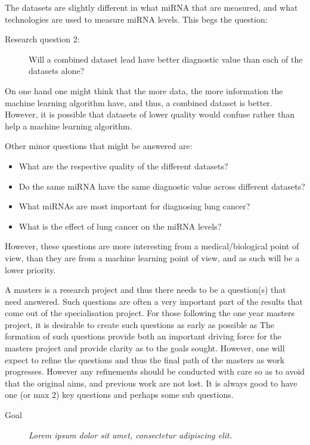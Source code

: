 The datasets are slightly different in what miRNA that are measured, and what technologies are used to measure miRNA levels. This begs the question:

\begin{description}
\item[Research question 2:] Will a combined dataset lead have better diagnostic value than each of the datasets alone?
\end{description}

On one hand one might think that the more data, the more information the machine learning algorithm have, and thus, a combined dataset is better. However, it is possible that datasets of lower quality would confuse rather than help a machine learning algorithm.

Other minor questions that might be answered are:
\begin{itemize}
    \item What are the respective quality of the different datasets?
    \item Do the same miRNA have the same diagnostic value across different datasets?
    \item What miRNAs are most important for diagnosing lung cancer?
    \item What is the effect of lung cancer on the miRNA levels?
\end{itemize}

However, these questions are more interesting from a medical/biological point of view, than they are from a machine learning point of view, and as such will be a lower priority.

\iffalse
A masters is a research project and thus there needs to be a question(s) that need answered. Such questions are often a very important part of the results that come out of the specialisation project. For those following the one year masters project, it is desirable to create such questions as early as possible as   The formation of such questions provide both an important driving force for the masters project and provide clarity as to the goals sought. However, one will expect to refine the questions and thus the final path of the masters as work progresses. However any refinements should be conducted with care so as to avoid that the original aims, and previous work are not lost.  
It is always good to have one (or max 2) key questions and perhaps some sub questions. 

\begin{description}
\item[Goal] {\it Lorem ipsum dolor sit amet, consectetur adipiscing elit.}
\end{description}

